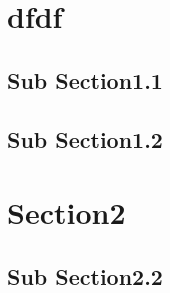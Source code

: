\documentclass{mycv}
\begin{document}
\section{dfdf}
\subsection{Sub Section1.1}
\subsection{Sub Section1.2}
\section{Section2}
\subsection{Sub Section2.2}
\lipsum[1]

\ttfamily\scshape\lipsum[2]

\textcolor{red}{\ttfamily\scshape\lipsum[2]}
\end{document}
